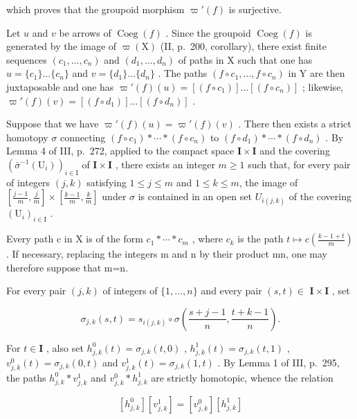 which proves that the groupoid morphism \(\varpi'(f)\) is surjective.

Let \(u\) and \(v\) be arrows of \(\operatorname{Coeg}(f)\) . Since the groupoid \(\operatorname{Coeg}(f)\) is generated by the image of \(\varpi(\mathrm{X})\) (II, p.~200, corollary), there exist finite sequences \((c_1, \ldots, c_n)\) and \((d_1, \ldots, d_n)\) of paths in X such that one has \(u = \{c_1\} \ldots \{c_n\}\) and \(v = \{d_1\} \ldots \{d_n\}\) . The paths \((f \circ c_1, \ldots, f \circ c_n)\) in Y are then juxtaposable and one has \(\varpi'(f)(u) = [(f \circ c_1)] \ldots [(f \circ c_n)]\) ; likewise, \(\varpi'(f)(v) = [(f \circ d_1)] \ldots [(f \circ d_n)]\) .

Suppose that we have \(\varpi'(f)(u) = \varpi'(f)(v)\) . There then exists a strict homotopy \(\sigma\) connecting \((f \circ c_1) * \cdots * (f \circ c_n)\) to \((f \circ d_1) * \cdots * (f \circ d_n)\) . By Lemma 4 of III, p.~272, applied to the compact space \(\mathbf{I} \times \mathbf{I}\) and the covering \((\bar{\sigma}^{-1}(\mathrm{U}_i))_{i \in \mathrm{I}}\) of \(\mathbf{I} \times \mathbf{I}\) , there exists an integer \(m \geqslant 1\) such that, for every pair of integers \((j,k)\) satisfying \(1 \leqslant j \leqslant m\) and \(1 \leqslant k \leqslant m\), the image of \([\frac{j-1}{m}, \frac{j}{m}] \times [\frac{k-1}{m}, \frac{k}{m}]\) under \(\sigma\) is contained in an open set \(U_{i(j,k)}\) of the covering \((\mathrm{U}_{i})_{i \in \mathrm{I}}\) .

Every path c in X is of the form \(c_{1}*\cdots*c_{m}\) , where \(c_{k}\) is the path \(t\mapsto c(\frac{k-1+t}{m})\) . If necessary, replacing the integers m and n by their product mn, one may therefore suppose that m=n.

For every pair \((j,k)\) of integers of \(\{1,\ldots ,n\}\) and every pair \((s,t)\in\) \(\mathbf{I}\times \mathbf{I}\) , set

\[
\sigma_ {j, k} (s, t) = s _ {i (j, k)} \circ \sigma \left(\frac {s + j - 1}{n}, \frac {t + k - 1}{n}\right).
\]

For \(t \in \mathbf{I}\) , also set \(h_{j,k}^{0}(t) = \sigma_{j,k}(t,0)\) , \(h_{j,k}^{1}(t) = \sigma_{j,k}(t,1)\) , \(v_{j,k}^{0}(t) = \sigma_{j,k}(0,t)\) and \(v_{j,k}^{1}(t) = \sigma_{j,k}(1,t)\) . By Lemma 1 of III, p.~295, the paths \(h_{j,k}^{0} * v_{j,k}^{1}\) and \(v_{j,k}^{0} * h_{j,k}^{1}\) are strictly homotopic, whence the relation

\[
[ h _ {j, k} ^ {0} ] [ v _ {j, k} ^ {1} ] = [ v _ {j, k} ^ {0} ] [ h _ {j, k} ^ {1} ]\tag{2}
\]

